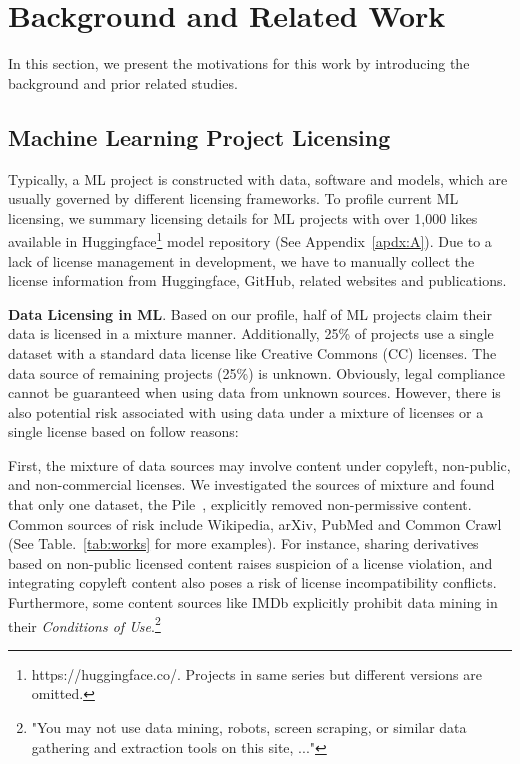 \section{Background and Related Work}
\label{sec:related}
In this section, we present the motivations for this work by introducing the background and prior related studies.

\subsection{Machine Learning Project Licensing}
Typically, a ML project is constructed with data, software and models, which are usually governed by different licensing frameworks.
To profile current ML licensing, we summary licensing details for ML projects with over 1,000 likes available in Huggingface\footnote{https://huggingface.co/. Projects in same series but different versions are omitted.} model repository (See Appendix~\ref{apdx:A}).
Due to a lack of license management in development, we have to manually collect the license information from Huggingface, GitHub, related websites and publications.

\textbf{Data Licensing in ML}.
Based on our profile, half of ML projects claim their data is licensed in a mixture manner.
Additionally, 25\% of projects use a single dataset with a standard data license like Creative Commons (CC) licenses.
The data source of remaining projects (25\%) is unknown.
Obviously, legal compliance cannot be guaranteed when using data from unknown sources. 
However, there is also potential risk associated with using data under a mixture of licenses or a single license based on follow reasons:

First, the mixture of data sources may involve content under copyleft, non-public, and non-commercial licenses. 
We investigated the sources of mixture and found that only one dataset, the Pile~\cite{gao2020the}, explicitly removed non-permissive content.
Common sources of risk include Wikipedia, arXiv, PubMed and Common Crawl~\cite{henderson2023foundation} (See Table.~\ref{tab:works} for more examples).
For instance, sharing derivatives based on non-public licensed content raises suspicion of a license violation, and integrating copyleft content also poses a risk of license incompatibility conflicts.
Furthermore, some content sources like IMDb explicitly prohibit data mining in their \textit{Conditions of Use}.\footnote{"You may not use data mining, robots, screen scraping, or similar data gathering and extraction tools on this site, ..."}


